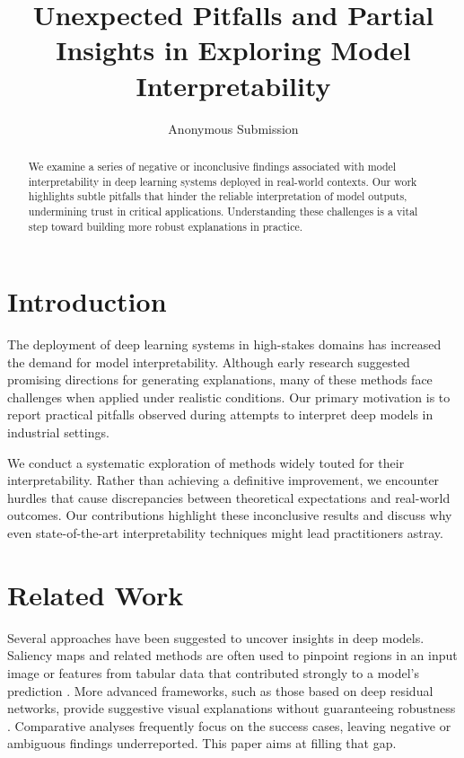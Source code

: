 \documentclass{article}
\title{Unexpected Pitfalls and Partial Insights in Exploring Model Interpretability}
\author{Anonymous Submission}
\date{}
\begin{document}
\maketitle

\begin{abstract}
We examine a series of negative or inconclusive findings associated with model interpretability in deep learning systems deployed in real-world contexts. Our work highlights subtle pitfalls that hinder the reliable interpretation of model outputs, undermining trust in critical applications. Understanding these challenges is a vital step toward building more robust explanations in practice.
\end{abstract}

\section{Introduction}
The deployment of deep learning systems in high-stakes domains has increased the demand for model interpretability. Although early research suggested promising directions for generating explanations, many of these methods face challenges when applied under realistic conditions. Our primary motivation is to report practical pitfalls observed during attempts to interpret deep models in industrial settings.

We conduct a systematic exploration of methods widely touted for their interpretability. Rather than achieving a definitive improvement, we encounter hurdles that cause discrepancies between theoretical expectations and real-world outcomes. Our contributions highlight these inconclusive results and discuss why even state-of-the-art interpretability techniques might lead practitioners astray.

\section{Related Work}
Several approaches have been suggested to uncover insights in deep models. Saliency maps and related methods are often used to pinpoint regions in an input image or features from tabular data that contributed strongly to a model's prediction \citep{lecun2015deep}. More advanced frameworks, such as those based on deep residual networks, provide suggestive visual explanations without guaranteeing robustness \citep{he2016resnet}. Comparative analyses frequently focus on the success cases, leaving negative or ambiguous findings underreported. This paper aims at filling that gap.
\end{document}

